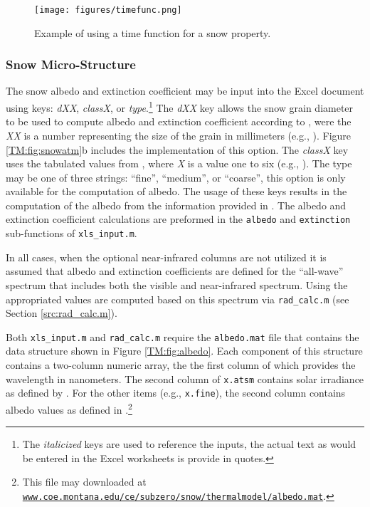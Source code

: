 \begin{figure}[b!]\centering
\texttt{[image: figures/timefunc.png]}
\caption{Example of using a time function for a snow property.}
\label{fig:timefunc}
\end{figure}


\subsubsection{Snow Micro-Structure} The snow albedo and extinction coefficient may be input into the Excel document using keys: \emph{dXX}, \emph{classX}, or \emph{type}.\footnote{The \emph{italicized} keys are used to reference the inputs, the actual text as would be entered in the Excel worksheets is provide in quotes.}  The \emph{dXX} key allows the snow grain diameter to be used to compute albedo and extinction coefficient according to \citet[Eq. 2.25, p. 56]{armstrong2008}, were the \emph{XX} is a number representing the size of the grain in millimeters (e.g., ).  Figure \ref{TM:fig:snowatm}b includes the implementation of this option. The \emph{classX} key uses the tabulated values from \citet[Tab. 2.6]{armstrong2008}, where \emph{X} is a value one to six (e.g., ).  The type may be one of three strings: ``fine'', ``medium'', or ``coarse'', this option is only available for the computation of albedo.  The usage of these keys results in the computation of the albedo from the information provided in \citet{baldridge2009}.  The albedo and extinction coefficient calculations are preformed in the \texttt{albedo} and \texttt{extinction} sub-functions of \texttt{xls\_input.m}.

In all cases, when the optional near-infrared columns are not utilized it is assumed that albedo and extinction coefficients are defined for the ``all-wave'' spectrum that includes both the visible and near-infrared spectrum.  Using \citet{ASTMg173} the appropriated values are computed based on this spectrum via \texttt{rad\_calc.m} (see Section \ref{src:rad_calc.m}).

Both \texttt{xls\_input.m} and \texttt{rad\_calc.m} require the \texttt{albedo.mat} file that contains the data structure shown in Figure \ref{TM:fig:albedo}.  Each component of this structure contains a two-column numeric array, the the first column of which provides the wavelength in nanometers.  The second column of \texttt{x.atsm} contains solar irradiance as defined by \citet{ASTMg173}.  For the other items (e.g., \texttt{x.fine}), the second column contains albedo values as defined in \citet{baldridge2009}.\footnote{This file may downloaded at \href{http://www.coe.montana.edu/ce/subzero/snow/thermalmodel/albedo.mat}{\nolinkurl{www.coe.montana.edu/ce/subzero/snow/thermalmodel/albedo.mat}}.}

